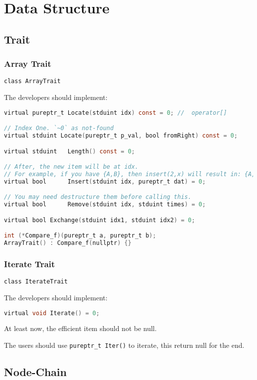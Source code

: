 
\section{Data Structure}

\subsection{Trait}

\subsubsection{Array Trait}

\verb|class ArrayTrait|

The developers should implement:

\lstset{style=GlobalC}
\begin{lstlisting}[language=C]
virtual pureptr_t Locate(stduint idx) const = 0; //  operator[]

// Index One. `~0` as not-found
virtual stduint Locate(pureptr_t p_val, bool fromRight) const = 0;

virtual stduint   Length() const = 0;

// After, the new item will be at idx.
// For example, if you have {A,B}, then insert(2,x) will result in: {A,B,x}
virtual bool      Insert(stduint idx, pureptr_t dat) = 0;

// You may need destructure them before calling this.
virtual bool      Remove(stduint idx, stduint times) = 0;

virtual bool Exchange(stduint idx1, stduint idx2) = 0;

int (*Compare_f)(pureptr_t a, pureptr_t b);
ArrayTrait() : Compare_f(nullptr) {}
\end{lstlisting}

\subsubsection{Iterate Trait}

\verb|class IterateTrait|

The developers should implement:

\lstset{style=GlobalC}
\begin{lstlisting}[language=C]
virtual void Iterate() = 0;
\end{lstlisting}

At least now, the efficient item should not be null.

The users should use \verb|pureptr_t Iter()| to iterate, this return null for the end.


\subsection{Node-Chain}



